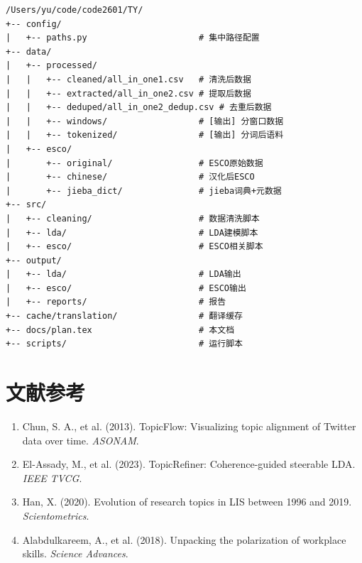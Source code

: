 \documentclass[12pt, a4paper]{ctexart}
\begin{document}
\begin{verbatim}
/Users/yu/code/code2601/TY/
+-- config/
|   +-- paths.py                      # 集中路径配置
+-- data/
|   +-- processed/
|   |   +-- cleaned/all_in_one1.csv   # 清洗后数据
|   |   +-- extracted/all_in_one2.csv # 提取后数据
|   |   +-- deduped/all_in_one2_dedup.csv # 去重后数据
|   |   +-- windows/                  # [输出] 分窗口数据
|   |   +-- tokenized/                # [输出] 分词后语料
|   +-- esco/
|       +-- original/                 # ESCO原始数据
|       +-- chinese/                  # 汉化后ESCO
|       +-- jieba_dict/               # jieba词典+元数据
+-- src/
|   +-- cleaning/                     # 数据清洗脚本
|   +-- lda/                          # LDA建模脚本
|   +-- esco/                         # ESCO相关脚本
+-- output/
|   +-- lda/                          # LDA输出
|   +-- esco/                         # ESCO输出
|   +-- reports/                      # 报告
+-- cache/translation/                # 翻译缓存
+-- docs/plan.tex                     # 本文档
+-- scripts/                          # 运行脚本
\end{verbatim}

\section{文献参考}

\begin{enumerate}
    \item Chun, S. A., et al. (2013). TopicFlow: Visualizing topic alignment of Twitter data over time. \textit{ASONAM}.
    \item El-Assady, M., et al. (2023). TopicRefiner: Coherence-guided steerable LDA. \textit{IEEE TVCG}.
    \item Han, X. (2020). Evolution of research topics in LIS between 1996 and 2019. \textit{Scientometrics}.
    \item Alabdulkareem, A., et al. (2018). Unpacking the polarization of workplace skills. \textit{Science Advances}.
\end{enumerate}
\end{document}
